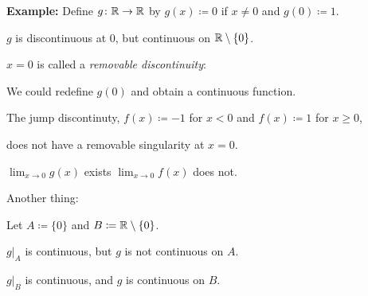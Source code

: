 \documentclass[10pt,aspectratio=149]{beamer}
\begin{document}
\begin{frame}

\textbf{Example:}
Define $g \colon {\mathbb{R}} \to {\mathbb{R}}$ by $g(x) \coloneqq 0$ if $x \not= 0$ and
$g(0) \coloneqq 1$.

\pause
\medskip

$g$ is discontinuous at $0$, but continuous on ${\mathbb{R}} \setminus \{ 0 \}$.

\pause
\medskip

$x=0$ is called a \emph{removable discontinuity}:

We could redefine $g(0)$ and obtain a continuous function.

\pause
\medskip

The jump discontinuty, $f(x) \coloneqq -1$ for $x < 0$ and $f(x) \coloneqq 1$ for $x \geq 0$,

does not have a removable singularity at $x=0$.

\pause
\medskip

$\displaystyle \lim_{x\to 0} g(x)$ exists \quad $\displaystyle \lim_{x\to 0} f(x)$ does not.

\pause
\medskip

Another thing:

Let $A \coloneqq \{ 0\}$ and $B\coloneqq {\mathbb{R}} \setminus \{0\}$.

\pause
\medskip

$g|_A$ is continuous, but $g$ is not continuous on $A$.

\pause
\medskip

$g|_B$ is continuous, and $g$ is continuous on $B$.

\end{frame}
\end{document}
